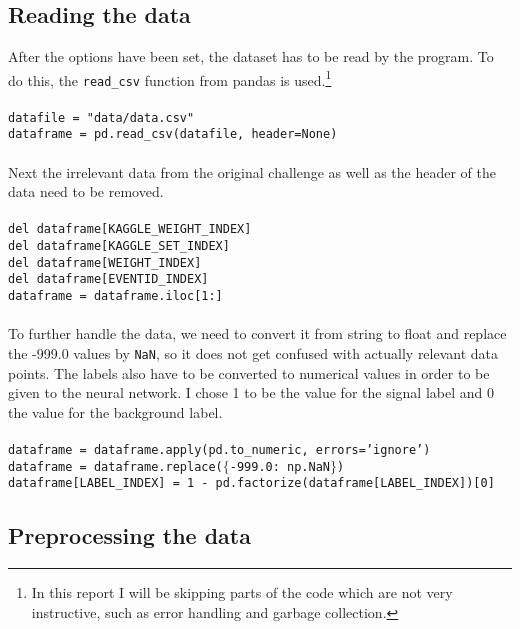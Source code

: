 \subsection{Reading the data}\label{subsec:code:reading}

After the options have been set, the dataset has to be read by the program.
To do this, the \texttt{read\_csv} function from pandas is used.\footnote{In this report I will be skipping parts of the code which are not very instructive, such as error handling and garbage collection.}
\\
\\
\noindent\texttt{datafile = "data/data.csv"\\
dataframe = pd.read\_csv(datafile, header=None)}
\\
\\
Next the irrelevant data from the original challenge as well as the header of the data need to be removed.
\\
\\
\noindent\texttt{del dataframe[KAGGLE\_WEIGHT\_INDEX]\\
del dataframe[KAGGLE\_SET\_INDEX]\\
del dataframe[WEIGHT\_INDEX]\\
del dataframe[EVENTID\_INDEX]\\
dataframe = dataframe.iloc[1:]}
\\
\\
To further handle the data, we need to convert it from string to float and replace the -999.0 values by \texttt{NaN}, so it does not get confused with actually relevant data points.
The labels also have to be converted to numerical values in order to be given to the neural network.
I chose 1 to be the value for the signal label and 0 the value for the background label.
\\
\\
\noindent\texttt{dataframe = dataframe.apply(pd.to\_numeric, errors='ignore')\\
dataframe = dataframe.replace($\{$-999.0: np.NaN$\}$)\\
dataframe[LABEL\_INDEX] = 1 - pd.factorize(dataframe[LABEL\_INDEX])[0]}

\subsection{Preprocessing the data}\label{subsec:code:prepro}

